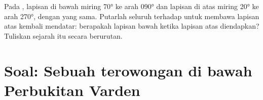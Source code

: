 \begin{exercise}[$\star\star\star$]\label{exo:b1:cross-sections:12}
Pada , lapisan di bawah miring \ang{70} ke arah \ang{090} dan lapisan di atas miring \ang{20} ke arah \ang{270}, dengan  yang sama. Putarlah seluruh  terhadap  untuk membawa lapisan atas kembali mendatar: berapakah  lapisan bawah ketika lapisan atas diendapkan? Tuliskan sejarah  itu secara berurutan.
\end{exercise}

\section{Soal: Sebuah terowongan di bawah Perbukitan Varden}

